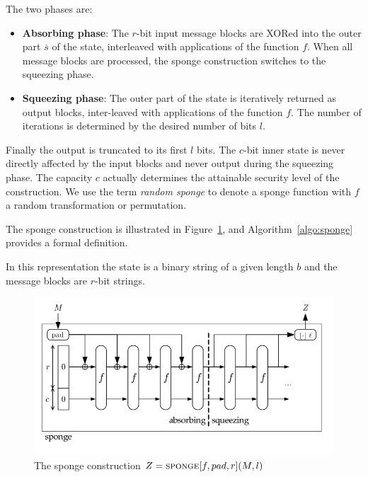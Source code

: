 The two phases are:
\begin{itemize}
\item \textbf{Absorbing phase}: The $r$-bit input message blocks are XORed into the outer part $\overline{s}$ of the state, interleaved with applications of the function $f$. When all message blocks are processed, the sponge construction switches to the squeezing phase.

\item \textbf{Squeezing phase}: The outer part of the state is iteratively returned as output blocks, inter-leaved with applications of the function $f$. The number of iterations is determined by the desired number of bits $l$.
\end{itemize}

Finally the output is truncated to its first $l$ bits. The $c$-bit inner state is never directly affected by the input blocks and never output during the squeezing phase. The capacity $c$ actually determines the attainable security level of the construction. We use the term \emph{random sponge} to denote a sponge function with $f$ a random transformation or permutation.

The sponge construction is illustrated in Figure~\ref{fig:sponge}, and Algorithm~\ref{algo:sponge} provides a formal definition.

In this representation the state is a binary string of a given length $b$ and the message blocks are $r$-bit strings.

\begin{figure}[H]
\centering
\includegraphics[scale=0.5]{img/sponge1.png}
\caption{\label{fig:sponge}The sponge construction $Z = \textsc{sponge}\lbrack f , pad, r\rbrack (M, l)$}
\end{figure}


